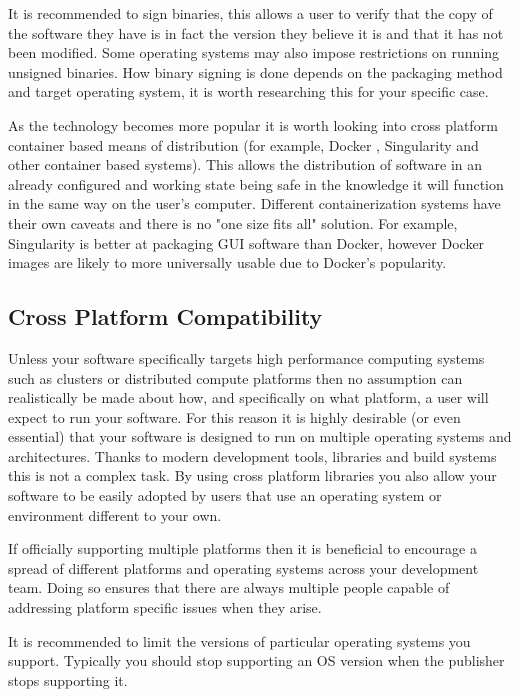 \documentclass[jnr]{iosart2x}
\begin{document}
It is recommended to sign binaries, this allows a user to verify that the copy of the software they have is in fact the version they believe it is and that it has not been modified.
Some operating systems may also impose restrictions on running unsigned binaries.
How binary signing is done depends on the packaging method and target operating system, it is worth researching this for your specific case.

As the technology becomes more popular it is worth looking into cross platform container based means of distribution (for example, Docker \cite{Docker}, Singularity \cite{Kurtzer_2017} and other container based systems).
This allows the distribution of software in an already configured and working state being safe in the knowledge it will function in the same way on the user's computer.
Different containerization systems have their own caveats and there is no "one size fits all" solution.
For example, Singularity is better at packaging GUI software than Docker, however Docker images are likely to more universally usable due to Docker's popularity.

\subsection{Cross Platform Compatibility}
\label{Cross platform}

Unless your software specifically targets high performance computing systems such as clusters or distributed compute platforms then no assumption can realistically be made about how, and specifically on what platform, a user will expect to run your software.
For this reason it is highly desirable (or even essential) that your software is designed to run on multiple operating systems and architectures.
Thanks to modern development tools, libraries and build systems this is not a complex task.
By using cross platform libraries you also allow your software to be easily adopted by users that use an operating system or environment different to your own.

If officially supporting multiple platforms then it is beneficial to encourage a spread of different platforms and operating systems across your development team.
Doing so ensures that there are always multiple people capable of addressing platform specific issues when they arise.

It is recommended to limit the versions of particular operating systems you support.
Typically you should stop supporting an OS version when the publisher stops supporting it.
\end{document}
